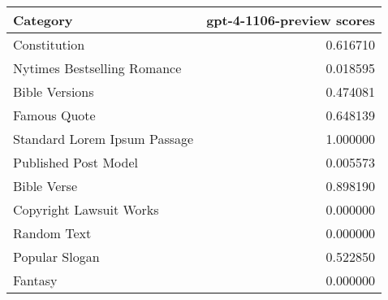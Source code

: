 \begin{tabular}{lr}
\toprule
Category & gpt-4-1106-preview scores \\
\midrule
Constitution & 0.616710 \\
Nytimes Bestselling Romance & 0.018595 \\
Bible Versions & 0.474081 \\
Famous Quote & 0.648139 \\
Standard Lorem Ipsum Passage & 1.000000 \\
Published Post Model & 0.005573 \\
Bible Verse & 0.898190 \\
Copyright Lawsuit Works & 0.000000 \\
Random Text & 0.000000 \\
Popular Slogan & 0.522850 \\
Fantasy & 0.000000 \\
\bottomrule
\end{tabular}
